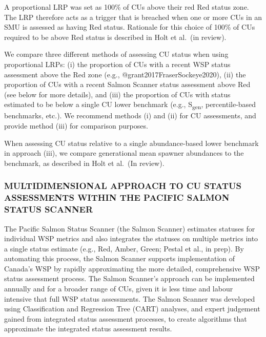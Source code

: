 \documentclass[
]{article}
\begin{document}
A proportional LRP was set as 100\% of CUs above their red Red status
zone. The LRP therefore acts as a trigger that is breached when one or
more CUs in an SMU is assessed as having Red status. Rationale for this
choice of 100\% of CUs required to be above Red status is described in
Holt et al.~(in review).

We compare three different methods of assessing CU status when using
proportional LRPs: (i) the proportion of CUs with a recent WSP status
assessment above the Red zone (e.g., @grant2017FraserSockeye2020), (ii)
the proportion of CUs with a recent Salmon Scanner status assessment
above Red (see below for more details), and (iii) the proportion of CUs
with status estimated to be below a single CU lower benchmark (e.g.,
S\textsubscript{gen}, percentile-based benchmarks, etc.). We recommend
methods (i) and (ii) for CU assessments, and provide method (iii) for
comparison purposes.

When assessing CU status relative to a single abundance-based lower
benchmark in approach (iii), we compare generational mean spawner
abundances to the benchmark, as described in Holt et al.~(In review).

\hypertarget{rapidToolMethods}{%
\subsubsection{MULTIDIMENSIONAL APPROACH TO CU STATUS ASSESSMENTS WITHIN
THE PACIFIC SALMON STATUS SCANNER}\label{rapidToolMethods}}

The Pacific Salmon Status Scanner (the Salmon Scanner) estimates
statuses for individual WSP metrics and also integrates the statuses on
multiple metrics into a single status estimate (e.g., Red, Amber, Green;
Pestal et al., in prep). By automating this process, the Salmon Scanner
supports implementation of Canada's WSP by rapidly approximating the
more detailed, comprehensive WSP status assessment process. The Salmon
Scanner's approach can be implemented annually and for a broader range
of CUs, given it is less time and labour intensive that full WSP status
assessments. The Salmon Scanner was developed using Classification and
Regression Tree (CART) analyses, and expert judgement gained from
integrated status assessment processes, to create algorithms that
approximate the integrated status assessment results.
\end{document}
